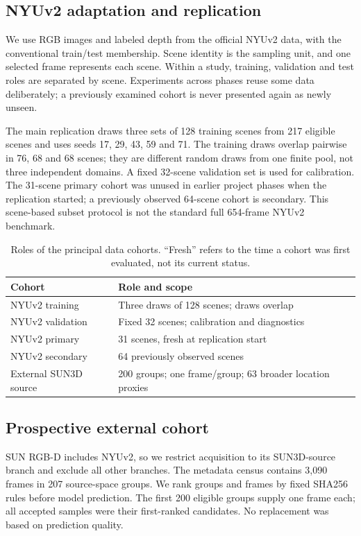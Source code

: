 \subsection{NYUv2 adaptation and replication}
We use RGB images and labeled depth from the official NYUv2 data, with the conventional train/test membership. Scene identity is the sampling unit, and one selected frame represents each scene. Within a study, training, validation and test roles are separated by scene. Experiments across phases reuse some data deliberately; a previously examined cohort is never presented again as newly unseen.

The main replication draws three sets of 128 training scenes from 217 eligible scenes and uses seeds 17, 29, 43, 59 and 71. The training draws overlap pairwise in 76, 68 and 68 scenes; they are different random draws from one finite pool, not three independent domains. A fixed 32-scene validation set is used for calibration. The 31-scene primary cohort was unused in earlier project phases when the replication started; a previously observed 64-scene cohort is secondary. This scene-based subset protocol is not the standard full 654-frame NYUv2 benchmark.

\begin{table}[t]
\centering\small
\caption{Roles of the principal data cohorts. ``Fresh'' refers to the time a cohort was first evaluated, not its current status.}
\label{tab:data}
\begin{tabular}{p{}p{}}\toprule
Cohort & Role and scope\\\midrule
NYUv2 training & Three draws of 128 scenes; draws overlap\\
NYUv2 validation & Fixed 32 scenes; calibration and diagnostics\\
NYUv2 primary & 31 scenes, fresh at replication start\\
NYUv2 secondary & 64 previously observed scenes\\
External SUN3D source & 200 groups; one frame/group; 63 broader location proxies\\\bottomrule
\end{tabular}
\end{table}

\subsection{Prospective external cohort}
SUN RGB-D includes NYUv2, so we restrict acquisition to its SUN3D-source branch and exclude all other branches. The metadata census contains 3,090 frames in 207 source-space groups. We rank groups and frames by fixed SHA256 rules before model prediction. The first 200 eligible groups supply one frame each; all accepted samples were their first-ranked candidates. No replacement was based on prediction quality.


